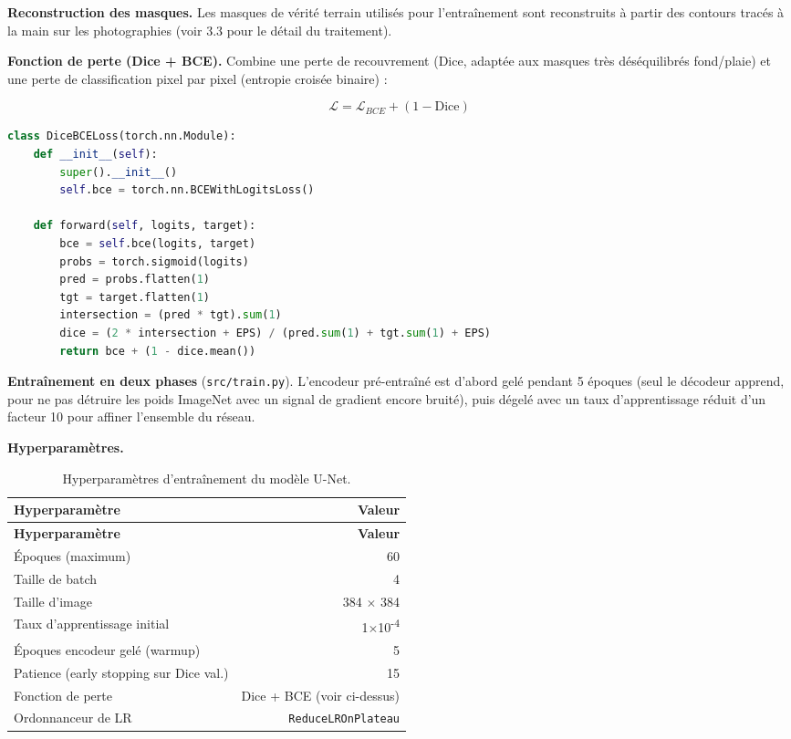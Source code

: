 \documentclass[12pt,a4paper]{report}
\begin{document}
\textbf{Reconstruction des masques.} Les masques de vérité terrain utilisés pour l'entraînement sont reconstruits à partir des contours tracés à la main sur les photographies (voir 3.3 pour le détail du traitement).

\textbf{Fonction de perte (Dice + BCE).} Combine une perte de recouvrement (Dice, adaptée aux masques très déséquilibrés fond/plaie) et une perte de classification pixel par pixel (entropie croisée binaire) :

\[
\mathcal{L} = \mathcal{L}_{BCE} + (1 - \mathrm{Dice})
\]

\begin{lstlisting}[language=Python]
class DiceBCELoss(torch.nn.Module):
    def __init__(self):
        super().__init__()
        self.bce = torch.nn.BCEWithLogitsLoss()

    def forward(self, logits, target):
        bce = self.bce(logits, target)
        probs = torch.sigmoid(logits)
        pred = probs.flatten(1)
        tgt = target.flatten(1)
        intersection = (pred * tgt).sum(1)
        dice = (2 * intersection + EPS) / (pred.sum(1) + tgt.sum(1) + EPS)
        return bce + (1 - dice.mean())
\end{lstlisting}

\textbf{Entraînement en deux phases} (\texttt{src/train.py}). L'encodeur pré-entraîné est d'abord gelé pendant 5 époques (seul le décodeur apprend, pour ne pas détruire les poids ImageNet avec un signal de gradient encore bruité), puis dégelé avec un taux d'apprentissage réduit d'un facteur 10 pour affiner l'ensemble du réseau.

\textbf{Hyperparamètres.}

\begin{longtable}{p{7.5cm} r}
\caption{Hyperparamètres d'entraînement du modèle U-Net.}
\label{tab:hyperparametres} \\
\toprule
\textbf{Hyperparamètre} & \textbf{Valeur} \\
\midrule
\endfirsthead
\toprule
\textbf{Hyperparamètre} & \textbf{Valeur} \\
\midrule
\endhead
Époques (maximum) & 60 \\
Taille de batch & 4 \\
Taille d'image & 384 $\times$ 384 \\
Taux d'apprentissage initial & 1$\times$10\textsuperscript{-4} \\
Époques encodeur gelé (warmup) & 5 \\
Patience (early stopping sur Dice val.) & 15 \\
Fonction de perte & Dice + BCE (voir ci-dessus) \\
Ordonnanceur de LR & \texttt{ReduceLROnPlateau} \\
\bottomrule
\end{longtable}
\end{document}
